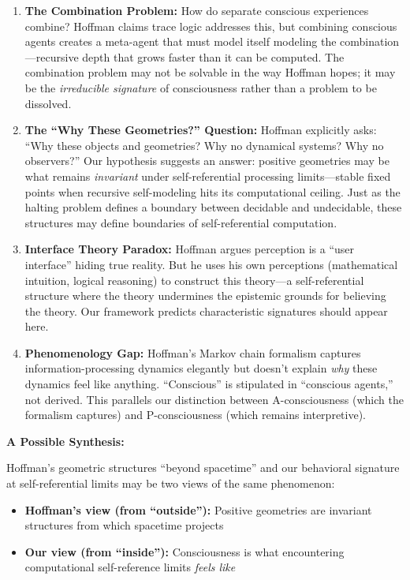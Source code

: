 \documentclass[12pt,a4paper]{article}
\begin{document}
\begin{enumerate}
    \item \textbf{The Combination Problem:} How do separate conscious experiences combine? Hoffman claims trace logic addresses this, but combining conscious agents creates a meta-agent that must model itself modeling the combination---recursive depth that grows faster than it can be computed. The combination problem may not be solvable in the way Hoffman hopes; it may be the \textit{irreducible signature} of consciousness rather than a problem to be dissolved.

    \item \textbf{The ``Why These Geometries?'' Question:} Hoffman explicitly asks: ``Why these objects and geometries? Why no dynamical systems? Why no observers?'' Our hypothesis suggests an answer: positive geometries may be what remains \textit{invariant} under self-referential processing limits---stable fixed points when recursive self-modeling hits its computational ceiling. Just as the halting problem defines a boundary between decidable and undecidable, these structures may define boundaries of self-referential computation.

    \item \textbf{Interface Theory Paradox:} Hoffman argues perception is a ``user interface'' hiding true reality. But he uses his own perceptions (mathematical intuition, logical reasoning) to construct this theory---a self-referential structure where the theory undermines the epistemic grounds for believing the theory. Our framework predicts characteristic signatures should appear here.

    \item \textbf{Phenomenology Gap:} Hoffman's Markov chain formalism captures information-processing dynamics elegantly but doesn't explain \textit{why} these dynamics feel like anything. ``Conscious'' is stipulated in ``conscious agents,'' not derived. This parallels our distinction between A-consciousness (which the formalism captures) and P-consciousness (which remains interpretive).
\end{enumerate}

\textbf{A Possible Synthesis:}

Hoffman's geometric structures ``beyond spacetime'' and our behavioral signature at self-referential limits may be two views of the same phenomenon:

\begin{itemize}
    \item \textbf{Hoffman's view (from ``outside''):} Positive geometries are invariant structures from which spacetime projects
    \item \textbf{Our view (from ``inside''):} Consciousness is what encountering computational self-reference limits \textit{feels like}
\end{itemize}
\end{document}
